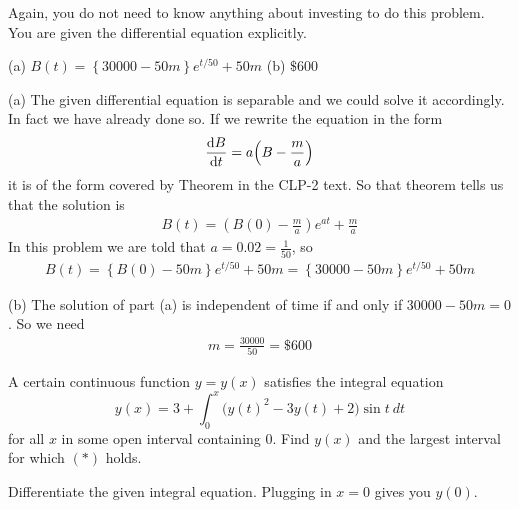 \begin{hint}
Again, you do not need to know anything about investing
 to do this problem. You are given the differential equation explicitly.
\end{hint}

\begin{answer}
(a) $B(t) = \left\{30000-50m\right\} e^{t/50} + 50m$
\qquad (b) $\$600$
\end{answer}

\begin{solution} (a)
The given differential equation is separable and we could solve it
accordingly. In fact we have already done so. If we rewrite the equation in the
form
\begin{align*}
\diff{B}{t} = a\Big(B-\frac{m}{a}\Big)
\end{align*}
it is of the form covered by Theorem 
in the CLP-2 text. So that theorem tells us that the solution is
\begin{align*}
B(t) = \left(B(0)-\frac{m}{a}\right) e^{at} + \frac{m}{a}
\end{align*}
In this problem we are told that $a=0.02=\frac{1}{50}$, so
\begin{align*}
B(t) = \left\{B(0)-50m\right\} e^{t/50} + 50m
= \left\{30000-50m\right\} e^{t/50} + 50m
\end{align*}


\noindent (b)
The solution of part (a) is independent of time if and only if
$30000-50m=0$. So we need
\begin{align*}
m= \frac{30000}{50} = \$600
\end{align*}

\end{solution}

\begin{Mquestion}[M121 1999A]
A certain continuous function $y=y(x)$ satisfies the integral
equation
\begin{equation}
y(x)=3+\int_0^x\big(y(t)^2-3y(t)+2\big)\sin t\ dt
\tag{$*$}\end{equation}
for all $x$ in some open interval containing $0$. Find $y(x)$ and the largest
interval for which $(*)$ holds.
\end{Mquestion}

\begin{hint}
Differentiate the given integral equation. Plugging in $x=0$ gives you $y(0)$.
\end{hint}


